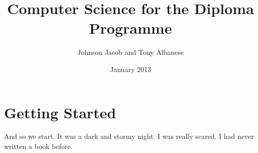 \documentclass[a4paper,12pt]{book}
\begin{document}
\author{Johnson Jacob and Tony Albanese}
\title{Computer Science for the Diploma Programme}
\date{January 2013}

\frontmatter
\maketitle
\tableofcontents

\mainmatter

\chapter{Getting Started}

And so we start. It was a dark and stormy night. I was really scared. I had never written a book before.
%
%

\backmatter
\end{document}
